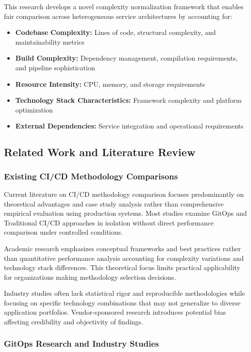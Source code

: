 This research develops a novel complexity normalization framework that enables fair comparison across heterogeneous service architectures by accounting for:
\begin{itemize}
\item \textbf{Codebase Complexity:} Lines of code, structural complexity, and maintainability metrics
\item \textbf{Build Complexity:} Dependency management, compilation requirements, and pipeline sophistication
\item \textbf{Resource Intensity:} CPU, memory, and storage requirements
\item \textbf{Technology Stack Characteristics:} Framework complexity and platform optimization
\item \textbf{External Dependencies:} Service integration and operational requirements
\end{itemize}

\subsection{Related Work and Literature Review}

\subsubsection{Existing CI/CD Methodology Comparisons}

Current literature on CI/CD methodology comparison focuses predominantly on theoretical advantages and case study analysis rather than comprehensive empirical evaluation using production systems. Most studies examine GitOps and Traditional CI/CD approaches in isolation without direct performance comparison under controlled conditions.

Academic research emphasizes conceptual frameworks and best practices rather than quantitative performance analysis accounting for complexity variations and technology stack differences. This theoretical focus limits practical applicability for organizations making methodology selection decisions.

Industry studies often lack statistical rigor and reproducible methodologies while focusing on specific technology combinations that may not generalize to diverse application portfolios. Vendor-sponsored research introduces potential bias affecting credibility and objectivity of findings.

\subsubsection{GitOps Research and Industry Studies}

